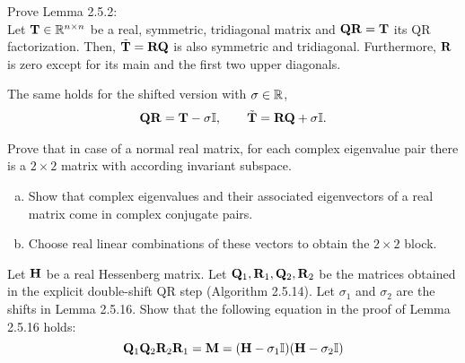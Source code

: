 
\begin{Sheet}\label{sheet6}
  
    \begin{Problem}
    Prove Lemma 2.5.2:\\
    Let $\mathbf T\in\mathbb R^{n\times n}$ be a real, symmetric, tridiagonal matrix and
    $\mathbf Q\mathbf R=\mathbf T$ its QR factorization. Then, $\tilde{\mathbf T}=\mathbf R\mathbf Q$ is also
    symmetric and tridiagonal. Furthermore, $\mathbf R$ is zero except for
    its main and the first two upper diagonals.
    
    The same holds for the shifted version with $\sigma\in\mathbb R$,
    \begin{gather*}
    \mathbf Q\mathbf R = \mathbf T-\sigma\mathbb I,\qquad \tilde{\mathbf T} = \mathbf R\mathbf Q+\sigma\mathbb I.
    \end{gather*}
  \end{Problem}

   \begin{Problem}
    Prove that in case of a normal real matrix, for each complex
    eigenvalue pair there is a $2\times 2$ matrix with according
    invariant subspace.
    \begin{enumerate}[(a)]
    \item Show that complex eigenvalues and their associated
        eigenvectors of a real matrix come in complex conjugate
        pairs.
    \item Choose real linear combinations of these vectors to obtain
      the $2\times 2$ block.
    \end{enumerate}
  \end{Problem}
  
    \begin{Problem}
    Let $\mathbf H$ be a real Hessenberg matrix. 
    Let $\mathbf Q_1,\mathbf R_1,\mathbf Q_2,\mathbf R_2$ be the matrices obtained in the explicit double-shift QR step (Algorithm 2.5.14).
    Let $\sigma_1$ and $\sigma_2$ are the shifts in Lemma 2.5.16.
    Show that the following equation in the proof of Lemma 2.5.16 holds:
    \begin{equation*}
	    \mathbf Q_1\mathbf Q_2\mathbf R_2\mathbf R_1 = \mathbf M = (\mathbf H - \sigma_1\mathbb I)(\mathbf H - \sigma_2\mathbb I)
    \end{equation*}
    
  \end{Problem}


\end{Sheet}
